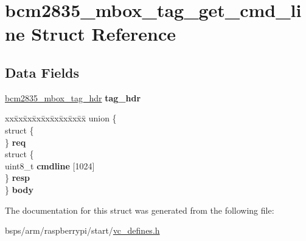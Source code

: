 \hypertarget{structbcm2835__mbox__tag__get__cmd__line}{}\section{bcm2835\+\_\+mbox\+\_\+tag\+\_\+get\+\_\+cmd\+\_\+line Struct Reference}
\label{structbcm2835__mbox__tag__get__cmd__line}
\subsection*{Data Fields}
\begin{DoxyCompactItemize}
\item 
\mbox{\label{structbcm2835__mbox__tag__get__cmd__line_a92cc292ddcb5f6517d2d7b0bf5fc0bcf}} 
\mbox{\hyperlink{structbcm2835__mbox__tag__hdr}{bcm2835\+\_\+mbox\+\_\+tag\+\_\+hdr}} {\bfseries tag\+\_\+hdr}
\item 
\mbox{\label{structbcm2835__mbox__tag__get__cmd__line_a6de82ce56af71856e632c51ad32c2d70}} 
\begin{tabbing}
xx\=xx\=xx\=xx\=xx\=xx\=xx\=xx\=xx\=\kill
union \{\\
\>struct \{\\
\>\} {\bfseries req}\\
\>struct \{\\
\>\>uint8\_t {\bfseries cmdline} \mbox{[}1024\mbox{]}\\
\>\} {\bfseries resp}\\
\} {\bfseries body}\\

\end{tabbing}\end{DoxyCompactItemize}


The documentation for this struct was generated from the following file\+:\begin{DoxyCompactItemize}
\item 
bsps/arm/raspberrypi/start/\mbox{\hyperlink{vc__defines_8h}{vc\+\_\+defines.\+h}}\end{DoxyCompactItemize}
